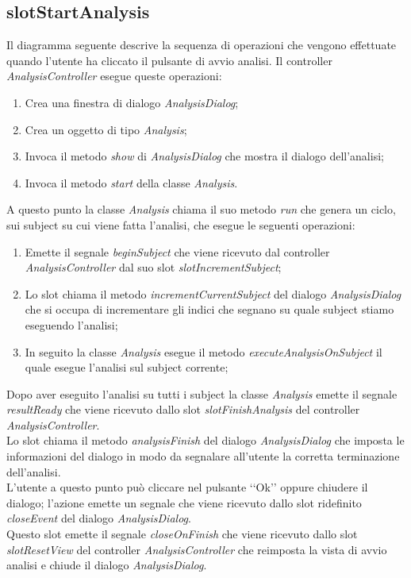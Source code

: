 \subsection{slotStartAnalysis}
\label{slotStartAnalysis}
Il diagramma seguente descrive la sequenza di operazioni che vengono effettuate quando l'utente ha cliccato il pulsante di avvio analisi.
Il controller \textit{AnalysisController} esegue queste operazioni:
\begin{enumerate}
	\item Crea una finestra di dialogo \textit{AnalysisDialog};
	\item Crea un oggetto di tipo \textit{Analysis};
	\item Invoca il metodo \textit{show} di \textit{AnalysisDialog} che mostra il dialogo dell'analisi;
	\item Invoca il metodo \textit{start} della classe \textit{Analysis}.
\end{enumerate}
A questo punto la classe \textit{Analysis} chiama il suo metodo \textit{run} che genera un ciclo, sui subject\g{} su cui viene fatta l'analisi, che esegue le seguenti operazioni:
\begin{enumerate}
	\item Emette il segnale \textit{beginSubject} che viene ricevuto dal controller \textit{AnalysisController} dal suo slot \textit{slotIncrementSubject};
	\item Lo slot chiama il metodo \textit{incrementCurrentSubject} del dialogo \textit{AnalysisDialog} che si occupa di incrementare gli indici che segnano su quale subject\g{} stiamo eseguendo l'analisi;
	\item In seguito la classe \textit{Analysis} esegue il metodo \textit{executeAnalysisOnSubject} il quale esegue l'analisi sul subject\g{} corrente;
\end{enumerate}
Dopo aver eseguito l'analisi su tutti i subject\g{} la classe \textit{Analysis} emette il segnale \textit{resultReady} che viene ricevuto dallo slot \textit{slotFinishAnalysis} del controller \textit{AnalysisController}.\\
Lo slot chiama il metodo \textit{analysisFinish} del dialogo \textit{AnalysisDialog} che imposta le informazioni del dialogo in modo da segnalare all'utente la corretta terminazione dell'analisi.\\
L'utente a questo punto può cliccare nel pulsante \lq\lq{}Ok\rq\rq{} oppure chiudere il dialogo; l'azione emette un segnale che viene ricevuto dallo slot ridefinito \textit{closeEvent} del dialogo \textit{AnalysisDialog}.\\
Questo slot emette il segnale \textit{closeOnFinish} che viene ricevuto dallo slot \textit{slotResetView} del controller \textit{AnalysisController} che reimposta la vista di avvio analisi e chiude il dialogo \textit{AnalysisDialog}.

